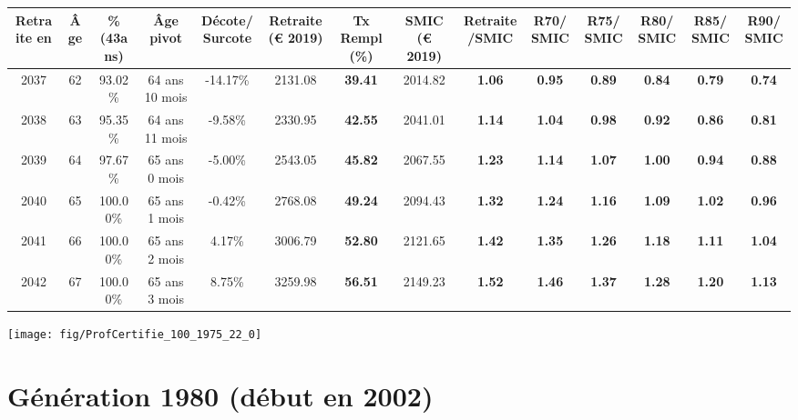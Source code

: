 \begin{adjustbox}{max width=\textwidth} 
\begin{tabular}[htb]{|c|c||c|c|c||c|c||c|c||c|c|c|c|c|} 
\hline 
 Retraite en &  Âge &  \%(43ans) &  Âge pivot &  Décote/Surcote &  Retraite (\euro{} 2019) &  Tx Rempl(\%) &  SMIC (\euro{} 2019) &  Retraite/SMIC &  R70/SMIC &  R75/SMIC &  R80/SMIC &  R85/SMIC &  R90/SMIC \\ 
\hline \hline 
 2037 &  62 &  93.02\% &  64 ans 10 mois &  -14.17\% &  2131.08 &  {\bf 39.41} &  2014.82 &  {\bf 1.06} &  {\bf {\color{red} 0.95}} &  {\bf {\color{red} 0.89}} &  {\bf {\color{red} 0.84}} &  {\bf {\color{red} 0.79}} &  {\bf {\color{red} 0.74}} \\ 
\hline 
 2038 &  63 &  95.35\% &  64 ans 11 mois &  -9.58\% &  2330.95 &  {\bf 42.55} &  2041.01 &  {\bf 1.14} &  {\bf 1.04} &  {\bf {\color{red} 0.98}} &  {\bf {\color{red} 0.92}} &  {\bf {\color{red} 0.86}} &  {\bf {\color{red} 0.81}} \\ 
\hline 
 2039 &  64 &  97.67\% &  65 ans 0 mois &  -5.00\% &  2543.05 &  {\bf 45.82} &  2067.55 &  {\bf 1.23} &  {\bf 1.14} &  {\bf 1.07} &  {\bf 1.00} &  {\bf {\color{red} 0.94}} &  {\bf {\color{red} 0.88}} \\ 
\hline 
 2040 &  65 &  100.00\% &  65 ans 1 mois &  -0.42\% &  2768.08 &  {\bf 49.24} &  2094.43 &  {\bf 1.32} &  {\bf 1.24} &  {\bf 1.16} &  {\bf 1.09} &  {\bf 1.02} &  {\bf {\color{red} 0.96}} \\ 
\hline 
 2041 &  66 &  100.00\% &  65 ans 2 mois &  4.17\% &  3006.79 &  {\bf 52.80} &  2121.65 &  {\bf 1.42} &  {\bf 1.35} &  {\bf 1.26} &  {\bf 1.18} &  {\bf 1.11} &  {\bf 1.04} \\ 
\hline 
 2042 &  67 &  100.00\% &  65 ans 3 mois &  8.75\% &  3259.98 &  {\bf 56.51} &  2149.23 &  {\bf 1.52} &  {\bf 1.46} &  {\bf 1.37} &  {\bf 1.28} &  {\bf 1.20} &  {\bf 1.13} \\ 
\hline 
\hline 
\end{tabular} 
\end{adjustbox} 
 
 \vspace{0.1cm} 

 {\hspace{-2.2cm}\texttt{[image: fig/ProfCertifie\_100\_1975\_22\_0]}} 

\newpage 
 
\section{Génération 1980 (début en 2002)\label{ProfCertifie_100_1980_22_0}} 
 
